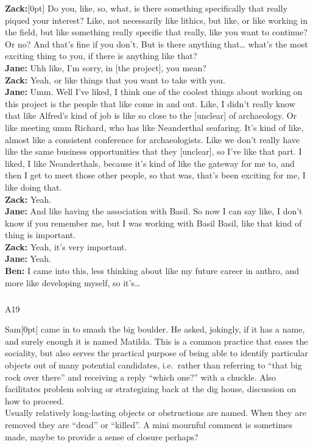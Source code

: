 \documentclass[
]{article}
\makeatletter
\let\oldsubparagraph\subparagraph
\renewcommand{\subparagraph}{
    \@ifstar
      \xxxSubParagraphStar
      \xxxSubParagraphNoStar
  }
\newcommand{\xxxSubParagraphStar}[1]{\oldsubparagraph*{#1}\mbox{}}
\newcommand{\xxxSubParagraphNoStar}[1]{\oldsubparagraph{#1}\mbox{}}
\newcommand{\paragraphnumber}[1]{\marginnote{\color{lightgray}\tiny{#1}}[0pt]}
\makeatother
\begin{document}
\textbf{Zack:}\paragraphnumber{[112]} Do you, like, so, what, is there
something specifically that really piqued your interest? Like, not
necessarily like lithics, but like, or like working in the field, but
like something really specific that really, like you want to continue?
Or no? And that's fine if you don't. But is there anything that\ldots{}
what's the most exciting thing to you, if there is anything like that?\\
\textbf{Jane:} Uhh like, I'm sorry, in {[}the project{]}, you mean?\\
\textbf{Zack:} Yeah, or like things that you want to take with you.\\
\textbf{Jane:} Umm. Well I've liked, I think one of the coolest things
about working on this project is the people that like come in and out.
Like, I didn't really know that like Alfred's kind of job is like so
close to the {[}unclear{]} of archaeology. Or like meeting umm Richard,
who has like Neanderthal seafaring. It's kind of like, almost like a
consistent conference for archaeologists. Like we don't really have like
the same business opportunities that they {[}unclear{]}, so I've like
that part. I liked, I like Neanderthals, because it's kind of like the
gateway for me to, and then I get to meet those other people, so that
was, that's been exciting for me, I like doing that.\\
\textbf{Zack:} Yeah.\\
\textbf{Jane:} And like having the association with Basil. So now I can
say like, I don't know if you remember me, but I was working with Basil
Basil, like that kind of thing is important.\\
\textbf{Zack:} Yeah, it's very important.\\
\textbf{Jane:} Yeah.\\
\textbf{Ben:} I came into this, less thinking about like my future
career in anthro, and more like developing myself, so it's\ldots{}

\subparagraph{A19}\label{sec-A19}

Sam\paragraphnumber{[113]} came in to smash the big boulder. He asked,
jokingly, if it has a name, and surely enough it is named Matilda. This
is a common practice that eases the sociality, but also serves the
practical purpose of being able to identify particular objects out of
many potential candidates, i.e.~rather than referring to ``that big rock
over there'' and receiving a reply ``which one?'' with a chuckle. Also
facilitates problem solving or strategizing back at the dig house,
discussion on how to proceed.\\
Usually relatively long-lasting objects or obstructions are named. When
they are removed they are ``dead'' or ``killed''. A mini mournful
comment is sometimes made, maybe to provide a sense of closure perhaps?
\end{document}
